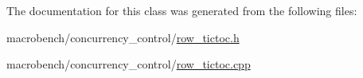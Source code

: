 The documentation for this class was generated from the following files\+:\begin{DoxyCompactItemize}
\item 
macrobench/concurrency\+\_\+control/\hyperlink{row__tictoc_8h}{row\+\_\+tictoc.\+h}\item 
macrobench/concurrency\+\_\+control/\hyperlink{row__tictoc_8cpp}{row\+\_\+tictoc.\+cpp}\end{DoxyCompactItemize}
